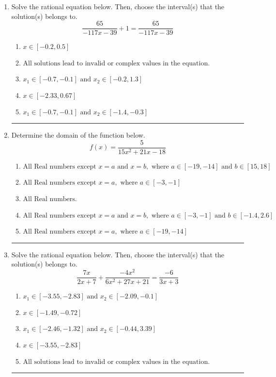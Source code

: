 \documentclass[14pt]{extbook}
\newcommand{\litem}[1]{\item#1\hspace*{-1cm}\rule{\textwidth}{0.4pt}}
\begin{document}
\begin{enumerate}
{\begin{enumerate}[label=\Alph*.]
\end{enumerate} }
\litem{
Solve the rational equation below. Then, choose the interval(s) that the solution(s) belongs to.\[ \frac{65}{-117x -39} + 1 = \frac{65}{-117x -39} \]\begin{enumerate}[label=\Alph*.]
\item \( x \in [-0.2,0.5] \)
\item \( \text{All solutions lead to invalid or complex values in the equation.} \)
\item \( x_1 \in [-0.7, -0.1] \text{ and } x_2 \in [-0.2,1.3] \)
\item \( x \in [-2.33,0.67] \)
\item \( x_1 \in [-0.7, -0.1] \text{ and } x_2 \in [-1.4,-0.3] \)

\end{enumerate} }
\litem{
Determine the domain of the function below.\[ f(x) = \frac{5}{15x^{2} +21 x -18} \]\begin{enumerate}[label=\Alph*.]
\item \( \text{All Real numbers except } x = a \text{ and } x = b, \text{ where } a \in [-19, -14] \text{ and } b \in [15, 18] \)
\item \( \text{All Real numbers except } x = a, \text{ where } a \in [-3, -1] \)
\item \( \text{All Real numbers.} \)
\item \( \text{All Real numbers except } x = a \text{ and } x = b, \text{ where } a \in [-3, -1] \text{ and } b \in [-1.4, 2.6] \)
\item \( \text{All Real numbers except } x = a, \text{ where } a \in [-19, -14] \)

\end{enumerate} }
\litem{
Solve the rational equation below. Then, choose the interval(s) that the solution(s) belongs to.\[ \frac{7x}{2x + 7} + \frac{-4x^{2}}{6x^{2} +27 x + 21} = \frac{-6}{3x + 3} \]\begin{enumerate}[label=\Alph*.]
\item \( x_1 \in [-3.55, -2.83] \text{ and } x_2 \in [-2.09,-0.1] \)
\item \( x \in [-1.49,-0.72] \)
\item \( x_1 \in [-2.46, -1.32] \text{ and } x_2 \in [-0.44,3.39] \)
\item \( x \in [-3.55,-2.83] \)
\item \( \text{All solutions lead to invalid or complex values in the equation.} \)


\end{enumerate}}
\end{enumerate}
\end{document}
